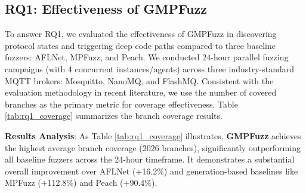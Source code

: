 \subsection{RQ1: Effectiveness of GMPFuzz}
To answer RQ1, we evaluated the effectiveness of GMPFuzz in discovering protocol states and triggering deep code paths compared to three baseline fuzzers: AFLNet, MPFuzz, and Peach. We conducted 24-hour parallel fuzzing campaigns (with 4 concurrent instances/agents) across three industry-standard MQTT brokers: Mosquitto, NanoMQ, and FlashMQ. Consistent with the evaluation methodology in recent literature, we use the number of covered branches as the primary metric for coverage effectiveness. Table \ref{tab:rq1_coverage} summarizes the branch coverage results.

\begin{table}[t]
    \centering
    \caption{Average number of branches covered by GMPFuzz and the baseline fuzzers in parallel mode within 24 hours, all with four fuzzing instances.}
    \label{tab:rq1_coverage}
\end{table}

\textbf{Results Analysis}:
As Table \ref{tab:rq1_coverage} illustrates, \textbf{GMPFuzz} achieves the highest average branch coverage (2026 branches), significantly outperforming all baseline fuzzers across the 24-hour timeframe. It demonstrates a substantial overall improvement over AFLNet (+16.2\%) and generation-based baselines like MPFuzz (+112.8\%) and Peach (+90.4\%).

